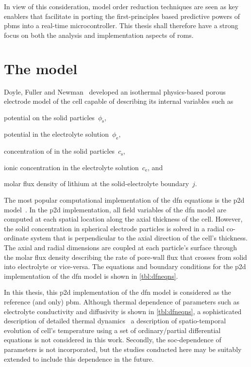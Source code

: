 In view of this consideration, model  order reduction techniques are seen as key
enablers that facilitate in porting the first-principles based predictive powers
of \glspl{pbm}  into a  real-time microcontroller.  This thesis  shall therefore
have  a  strong  focus  on  both the  analysis  and  implementation  aspects  of
\glspl{rom}.

\section{The  model}\label{sec:dfnmodel}

Doyle,  Fuller and  Newman~\cite{Doyle1993,Fuller1994}  developed an  isothermal
physics-based  porous electrode  model of  the  cell capable  of describing  its
internal variables such as
\begin{enumerate*}[label=\itshape\alph*\upshape)]
    \item potential on the solid particles~$\phi_\text{s}$,
    \item potential in the electrolyte solution~$\phi_\text{e}$,
    \item concentration of  in the solid particles~$c_\text{s}$,
    \item ionic concentration in the electrolyte solution~$c_\text{e}$, and
    \item molar flux density of lithium at the solid-electrolyte boundary~$j$.
\end{enumerate*}
The most popular computational implementation  of the \gls{dfn} equations is the
\gls{p2d}  model~\cite{Plett2015}. In  the \gls{p2d}  implementation, all  field
variables  of  the  \gls{dfn}  model  are  computed  at  each  spatial  location
along  the axial  thickness of  the cell.  However, the  solid concentration  in
spherical electrode particles  is solved in a radial co-ordinate  system that is
perpendicular to  the axial  direction of  the cell's  thickness. The  axial and
radial dimensions are coupled at each  particle's surface through the molar flux
density  describing the  rate of  pore-wall flux  that crosses  from solid  into
electrolyte  or  vice-versa.  The  equations and  boundary  conditions  for  the
\gls{p2d} implementation of the \gls{dfn} model is shown in \cref{tbl:dfneqns}.



In  this  thesis,  this  \gls{p2d}  implementation of  the  \gls{dfn}  model  is
considered as  the reference (and  only) \gls{pbm}. Although  thermal dependence
of  parameters  such  as  electrolyte  conductivity  and  diffusivity  is  shown
in \cref{tbl:dfneqns}, a sophisticated description  of detailed thermal dynamics
\ie~a description  of spatio-temporal evolution of cell's  temperature using a
set of ordinary/partial  differential equations is not considered  in this work.
Secondly, the \gls{soc}-dependence of parameters is not incorporated, but the
studies conducted here may be suitably extended to include this dependence in
the future.

